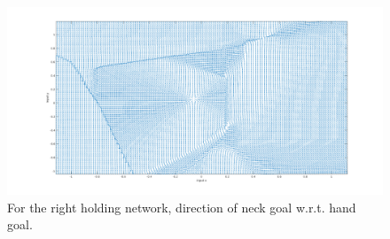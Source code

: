 \documentclass[12pt]{article}
\begin{document}
\begin{figure}[!htb]
\includegraphics[width=\linewidth]{figures/right/direction.png}
\endminipage\hfill
\caption{For the right holding network, direction of neck goal w.r.t. hand goal.}
\label{fig:rd}
\end{figure}
\end{document}
